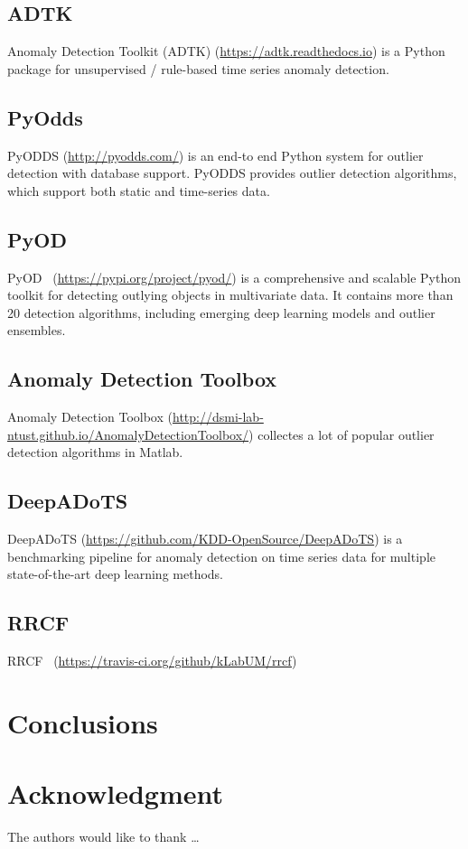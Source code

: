 \subsection{ADTK}

Anomaly Detection Toolkit (ADTK) (\href{https://adtk.readthedocs.io}{https://adtk.readthedocs.io}) is a Python package for 
unsupervised / rule-based time series anomaly detection.

\subsection{PyOdds}

PyODDS (\href{http://pyodds.com/}{http://pyodds.com/}) is an end-to end Python system for
outlier detection with database support. 
PyODDS provides outlier detection algorithms, 
which support both static and time-series data.

\subsection{PyOD}

PyOD~\cite{zhao2019pyod} (\href{https://pypi.org/project/pyod/}{https://pypi.org/project/pyod/}) 
is a comprehensive and scalable Python toolkit for 
detecting outlying objects in multivariate data. 
It contains more than 20 detection algorithms, 
including emerging deep learning models and 
outlier ensembles.

\subsection{Anomaly Detection Toolbox}

Anomaly Detection Toolbox 
(\href{http://dsmi-lab-ntust.github.io/AnomalyDetectionToolbox/}{http://dsmi-lab-ntust.github.io/AnomalyDetectionToolbox/})
collectes a lot of popular outlier detection algorithms in Matlab.

\subsection{DeepADoTS}

DeepADoTS (\href{https://github.com/KDD-OpenSource/DeepADoTS}{https://github.com/KDD-OpenSource/DeepADoTS})
is a benchmarking pipeline for anomaly detection on
time series data for 
multiple state-of-the-art deep learning methods.

\subsection{RRCF}
RRCF~\cite{bartos_2019_rrcf} (\href{https://travis-ci.org/github/kLabUM/rrcf}{https://travis-ci.org/github/kLabUM/rrcf})



\section{Conclusions} \label{sec-conclusions}

\blindtext

\section*{Acknowledgment}

\lipsum[1]


The authors would like to thank \ldots

